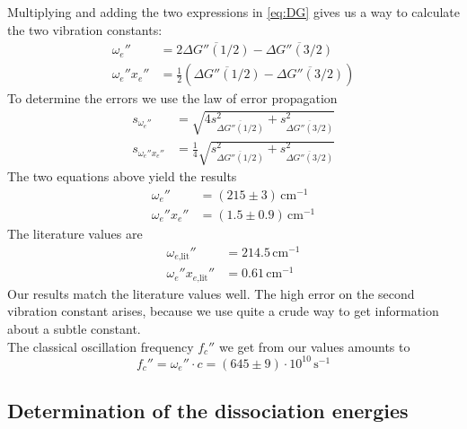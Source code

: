 Multiplying and adding the two expressions in \autoref{eq:DG}
gives us a way to calculate the two vibration constants:
\begin{equation}
\begin{split}
  \omega_e'' & =2\overline{\Delta G''(1/2)}- \overline{\Delta G''(3/2)}\\
  \omega_e''x_e'' & =\frac{1}{2}(\overline{\Delta G''(1/2)}- \overline{\Delta G''(3/2)})
  \end{split}
\end{equation}
To determine the errors we use the law of error propagation
\begin{equation}
\begin{split}
  s_{\omega_e''} & =\sqrt{4s^2_{\overline{\Delta G''(1/2)}}+ s^2_{\overline{\Delta G''(3/2)}}}\\
  s_{\omega_e''x_e''} & =\frac{1}{4}\sqrt{s^2_{\overline{\Delta G''(1/2)}}+ s^2_{\overline{\Delta G''(3/2)}}}
\end{split}
\end{equation}
The two equations above yield the results
\begin{equation}
\label{eq:groundstatevibconsts}
\begin{split}
  \omega_e'' & =(215 \pm 3)\,\text{cm}^{-1}\\
  \omega_e''x_e'' & =(1.5 \pm 0.9)\,\text{cm}^{-1}
  \end{split}
\end{equation}
The literature values \cite{rank} are %
\begin{equation}
\begin{split}
  \omega_{e\text{,lit}}'' & =214.5\,\text{cm}^{-1}\\
  \omega_e''x_{e\text{,lit}}'' & =0.61\,\text{cm}^{-1}
  \end{split}
\end{equation}
Our results match the literature values well. The high error on the second vibration constant
arises, because we use quite a crude way to get information about a subtle constant.\\
The classical oscillation frequency $f_c''$ we get from our values amounts to
\begin{equation}
  f_c''= \omega_e'' \cdot c = (645 \pm 9 ) \cdot 10^{10}\, \text{s}^{-1}
\end{equation}

\subsection{Determination of the dissociation energies}

